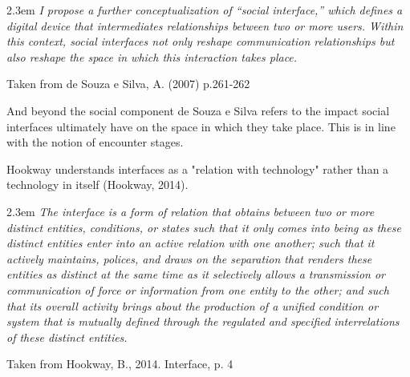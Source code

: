 
\begin{singlespace}
	\leftskip2.3em
		\rightskip\leftskip
\textit{\small I propose a further conceptualization of “social interface,” which defines a digital device that intermediates relationships between two or more users. Within this context, social interfaces not only reshape communication relationships but also reshape the space in which this interaction takes place.} 

\small Taken from de Souza e Silva, A. (2007) p.261-262
\end{singlespace}

And beyond the social component de Souza e Silva refers to the impact social interfaces ultimately have on the space in which they take place. This is in line with the notion of encounter stages. 

Hookway understands interfaces as a "relation with technology" rather than a technology in itself (Hookway, 2014).


\begin{singlespace}
	\leftskip2.3em
		\rightskip\leftskip
\textit{\small The interface is a form of relation that obtains between two or more distinct entities, conditions, or states such that it only comes into being as these distinct entities enter into an active relation with one another; such that it actively maintains, polices, and draws on the separation that renders these entities as distinct at the same time as it selectively allows a transmission or communication of force or information from one entity to the other; and such that its overall activity brings about the production of a unified condition or system that is mutually defined through the regulated and specified interrelations of these distinct entities.} 

\small Taken from Hookway, B., 2014. Interface, p. 4
\end{singlespace}

